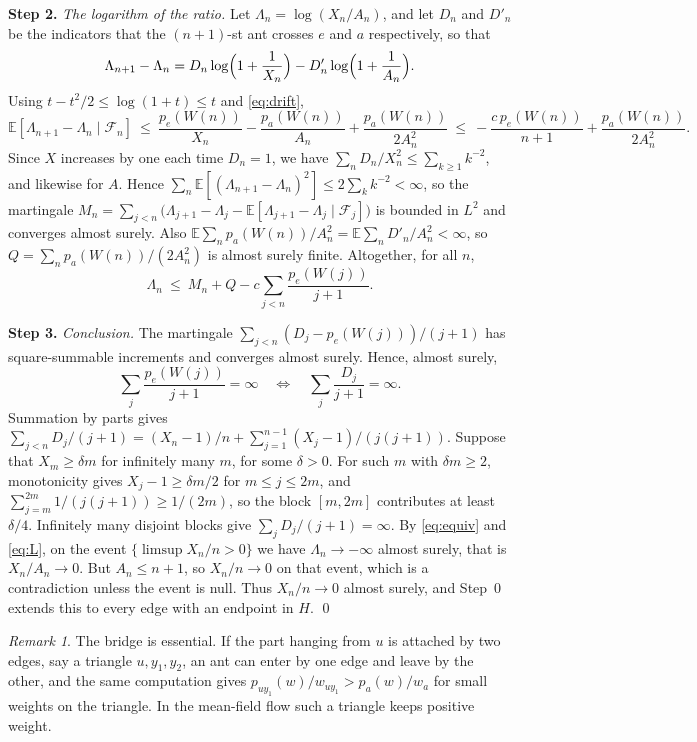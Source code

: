 \documentclass[11pt]{amsart}
\theoremstyle{remark}
\newtheorem{remark}[theorem]{Remark}
\newcommand{\EE}{\mathbb{E}}
\newcommand{\cF}{\mathcal{F}}
\begin{document}
\medskip\noindent\textbf{Step 2.} \emph{The logarithm of the ratio.} Let $\Lambda_n=\log(X_n/A_n)$, and let $D_n$ and
$D'_n$ be the indicators that the $(n+1)$-st ant crosses $e$ and $a$ respectively, so that
\[
\Lambda_{n+1}-\Lambda_n=D_n\log\Bigl(1+\frac1{X_n}\Bigr)-D'_n\log\Bigl(1+\frac1{A_n}\Bigr).
\]
Using $t-t^2/2\le\log(1+t)\le t$ and \eqref{eq:drift},
\[
\EE[\Lambda_{n+1}-\Lambda_n\mid\cF_n]\ \le\ \frac{p_e(W(n))}{X_n}-\frac{p_a(W(n))}{A_n}+\frac{p_a(W(n))}{2A_n^2}
\ \le\ -\frac{c\,p_e(W(n))}{n+1}+\frac{p_a(W(n))}{2A_n^2}.
\]
Since $X$ increases by one each time $D_n=1$, we have $\sum_nD_n/X_n^2\le\sum_{k\ge1}k^{-2}$, and likewise for $A$.
Hence $\sum_n\EE[(\Lambda_{n+1}-\Lambda_n)^2]\le2\sum_kk^{-2}<\infty$, so the martingale
$M_n=\sum_{j<n}\bigl(\Lambda_{j+1}-\Lambda_j-\EE[\Lambda_{j+1}-\Lambda_j\mid\cF_j]\bigr)$ is bounded in $L^2$ and converges almost surely.
Also $\EE\sum_np_a(W(n))/A_n^2=\EE\sum_nD'_n/A_n^2<\infty$, so $Q=\sum_np_a(W(n))/(2A_n^2)$ is almost surely finite.
Altogether, for all $n$,
\begin{equation}\label{eq:L}
\Lambda_n\ \le\ M_n+Q-c\sum_{j<n}\frac{p_e(W(j))}{j+1}.
\end{equation}

\medskip\noindent\textbf{Step 3.} \emph{Conclusion.} The martingale $\sum_{j<n}(D_j-p_e(W(j)))/(j+1)$ has
square-summable increments and converges almost surely. Hence, almost surely,
\begin{equation}\label{eq:equiv}
\sum_j\frac{p_e(W(j))}{j+1}=\infty\quad\Longleftrightarrow\quad\sum_j\frac{D_j}{j+1}=\infty .
\end{equation}
Summation by parts gives $\sum_{j<n}D_j/(j+1)=(X_n-1)/n+\sum_{j=1}^{n-1}(X_j-1)/(j(j+1))$. Suppose that
$X_m\ge\delta m$ for infinitely many $m$, for some $\delta>0$. For such $m$ with $\delta m\ge2$, monotonicity gives
$X_j-1\ge\delta m/2$ for $m\le j\le2m$, and $\sum_{j=m}^{2m}1/(j(j+1))\ge1/(2m)$, so the block $[m,2m]$ contributes at
least $\delta/4$. Infinitely many disjoint blocks give $\sum_jD_j/(j+1)=\infty$. By \eqref{eq:equiv} and \eqref{eq:L},
on the event $\{\limsup X_n/n>0\}$ we have $\Lambda_n\to-\infty$ almost surely, that is $X_n/A_n\to0$. But $A_n\le n+1$, so
$X_n/n\to0$ on that event, which is a contradiction unless the event is null. Thus $X_n/n\to0$ almost surely, and
Step~0 extends this to every edge with an endpoint in $H$. \qed

\begin{remark}
The bridge is essential. If the part hanging from $u$ is attached by two edges, say a triangle $u,y_1,y_2$, an ant
can enter by one edge and leave by the other, and the same computation gives $p_{uy_1}(w)/w_{uy_1}>p_a(w)/w_a$ for
small weights on the triangle. In the mean-field flow such a triangle keeps positive weight.
\end{remark}
\end{document}
